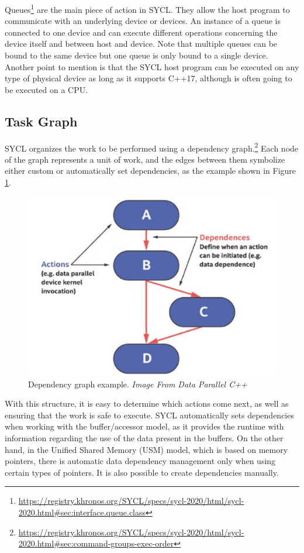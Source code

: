 Queues\footnote{\url{https://registry.khronos.org/SYCL/specs/sycl-2020/html/sycl-2020.html\#sec:interface.queue.class}} are the main piece of action in SYCL.
They allow the host program to communicate with an underlying device or devices.
An instance of a queue is connected to one device and can execute different operations concerning the device itself and between host and device.
Note that multiple queues can be bound to the same device but one queue is only bound to a single device.
Another point to mention is that the SYCL host program can be executed on any type of physical device as long as it supports C++17, although is often going to be executed on a CPU.

\subsection{Task Graph}

SYCL organizes the work to be performed using a dependency graph.\footnote{\url{https://registry.khronos.org/SYCL/specs/sycl-2020/html/sycl-2020.html\#sec:command-groups-exec-order}}
Each node of the graph represents a unit of work, and the edges between them symbolize either custom or automatically set dependencies, as the example shown in Figure \ref{fig:dependency-graph}.

\begin{figure}[H]
    \centering
    \includegraphics[width=0.7\linewidth]{images/dependency-graph.png}
    \caption{Dependency graph example. \textit{Image From Data Parallel C++} \cite{Reinders:2023:Data}}
    \label{fig:dependency-graph}
\end{figure}

With this structure, it is easy to determine which actions come next, as well as ensuring that the work is safe to execute.
SYCL automatically sets dependencies when working with the buffer/accessor model, as it provides the runtime with information regarding the use of the data present in the buffers.
On the other hand, in the Unified Shared Memory (USM) model, which is based on memory pointers, there is automatic data dependency management only when using certain types of pointers.
It is also possible to create dependencies manually.

